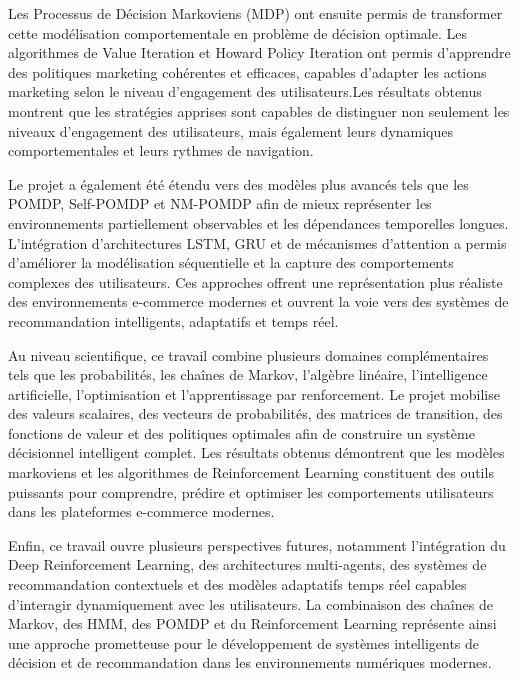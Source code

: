 \documentclass[11pt,a4paper]{article}
\begin{document}
Les Processus de Décision Markoviens (MDP) ont ensuite permis de transformer cette modélisation comportementale en problème de décision optimale. Les algorithmes de Value Iteration et Howard Policy Iteration ont permis d’apprendre des politiques marketing cohérentes et efficaces, capables d’adapter les actions marketing selon le niveau d’engagement des utilisateurs.Les résultats obtenus montrent que les stratégies apprises sont capables de distinguer non seulement les niveaux d’engagement des utilisateurs, mais également leurs dynamiques comportementales et leurs rythmes de navigation.

Le projet a également été étendu vers des modèles plus avancés tels que les POMDP, Self-POMDP et NM-POMDP afin de mieux représenter les environnements partiellement observables et les dépendances temporelles longues. L’intégration d’architectures LSTM, GRU et de mécanismes d’attention a permis d’améliorer la modélisation séquentielle et la capture des comportements complexes des utilisateurs. Ces approches offrent une représentation plus réaliste des environnements e-commerce modernes et ouvrent la voie vers des systèmes de recommandation intelligents, adaptatifs et temps réel.

Au niveau scientifique, ce travail combine plusieurs domaines complémentaires tels que les probabilités, les chaînes de Markov, l’algèbre linéaire, l’intelligence artificielle, l’optimisation et l’apprentissage par renforcement. Le projet mobilise des valeurs scalaires, des vecteurs de probabilités, des matrices de transition, des fonctions de valeur et des politiques optimales afin de construire un système décisionnel intelligent complet. Les résultats obtenus démontrent que les modèles markoviens et les algorithmes de Reinforcement Learning constituent des outils puissants pour comprendre, prédire et optimiser les comportements utilisateurs dans les plateformes e-commerce modernes.

Enfin, ce travail ouvre plusieurs perspectives futures, notamment l’intégration du Deep Reinforcement Learning, des architectures multi-agents, des systèmes de recommandation contextuels et des modèles adaptatifs temps réel capables d’interagir dynamiquement avec les utilisateurs. La combinaison des chaînes de Markov, des HMM, des POMDP et du Reinforcement Learning représente ainsi une approche prometteuse pour le développement de systèmes intelligents de décision et de recommandation dans les environnements numériques modernes.

\end{document}
